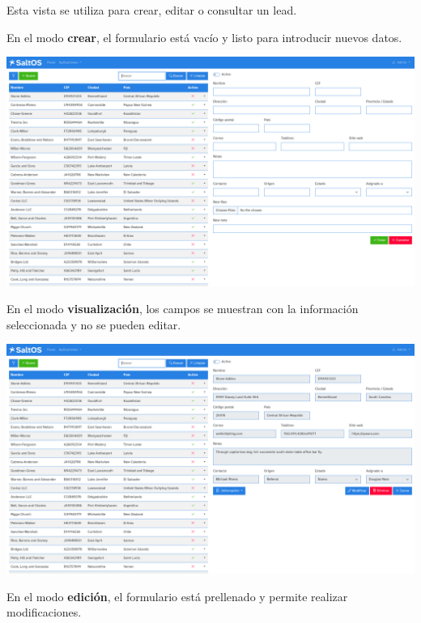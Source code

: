 \documentclass[a4paper]{article}
\begin{document}
Esta vista se utiliza para crear, editar o consultar un lead.

En el modo \textbf{crear}, el formulario está vacío y listo para introducir nuevos datos.

\begin{center}\includegraphics[width=1\textwidth]{../ujest/snaps/test-screenshots-js-screenshots-crm-leads-create-es-es-1-snap.png}\end{center}

En el modo \textbf{visualización}, los campos se muestran con la información seleccionada y no se pueden editar.

\begin{center}\includegraphics[width=1\textwidth]{../ujest/snaps/test-screenshots-js-screenshots-crm-leads-view-100-es-es-1-snap.png}\end{center}

En el modo \textbf{edición}, el formulario está prellenado y permite realizar modificaciones.
\end{document}

